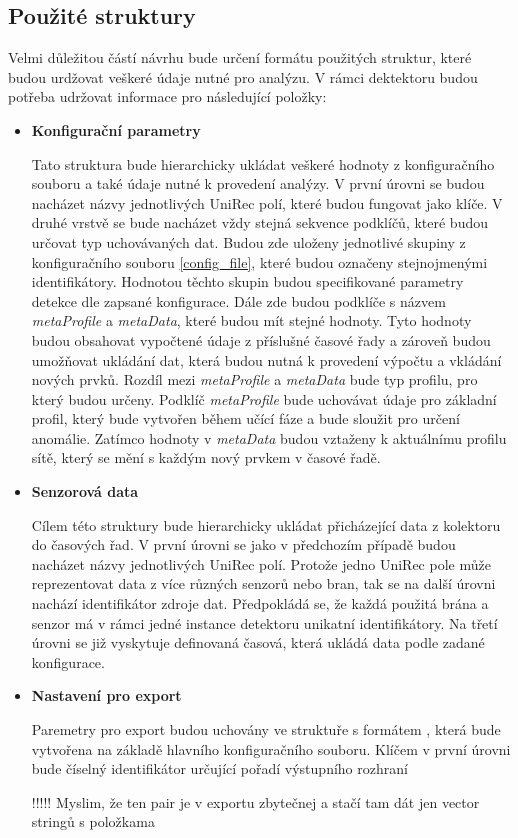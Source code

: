  \subsection{Použité struktury}
 Velmi důležitou částí návrhu bude určení formátu použitých struktur, které budou urdžovat veškeré 
 údaje nutné pro analýzu. V rámci dektektoru budou potřeba udržovat informace pro následující
 položky:
  \begin{itemize}
   \item \textbf{Konfigurační parametry}
   
   Tato struktura bude hierarchicky ukládat veškeré hodnoty z konfiguračního souboru
   a také údaje nutné k provedení analýzy. V první úrovni se budou nacházet názvy jednotlivých 
   UniRec polí, které budou fungovat jako klíče. V druhé vrstvě se bude nacházet vždy stejná 
   sekvence podklíčů, které budou určovat typ uchovávaných dat. Budou zde uloženy jednotlivé 
   skupiny z konfiguračního souboru \ref{config_file}, které budou označeny stejnojmenými
   identifikátory. Hodnotou těchto skupin budou specifikované parametry detekce dle zapsané
   konfigurace. Dále zde budou podklíče s názvem \textit{metaProfile} a \textit{metaData},
   které budou mít
   stejné hodnoty. Tyto hodnoty budou obsahovat vypočtené údaje z příslušné časové řady
   a zároveň budou umožňovat ukládání dat, která budou nutná k provedení výpočtu 
   a vkládání nových prvků. Rozdíl mezi \textit{metaProfile} a \textit{metaData} bude typ profilu,
   pro který budou určeny. Podklíč \textit{metaProfile} bude uchovávat údaje pro základní profil,
   který bude vytvořen během učící fáze a bude sloužit pro určení anomálie. Zatímco 
   hodnoty v \textit{metaData} budou vztaženy k aktuálnímu profilu sítě, který se mění s každým
   nový prvkem v časové řadě.
   
   \item \textbf{Senzorová data}
   
   Cílem této struktury bude hierarchicky ukládat přicházející data z kolektoru do časových řad. 
   V první úrovni se jako v předchozím případě budou nacházet názvy jednotlivých UniRec polí. 
   Protože jedno UniRec pole může reprezentovat data z více různých senzorů nebo bran, tak se na 
   další úrovni nachází identifikátor zdroje dat. Předpokládá se, že každá použitá brána a senzor 
   má v rámci jedné instance detektoru unikatní identifikátory. Na třetí úrovni se již vyskytuje 
   definovaná časová, která ukládá data podle zadané konfigurace.
   
   \item \textbf{Nastavení pro export} 
   
   Paremetry pro export budou uchovány ve struktuře s formátem , která bude vytvořena na základě 
   hlavního konfiguračního souboru. Klíčem v první úrovni bude číselný identifikátor určující 
   pořadí výstupního rozhraní 
   
   !!!!! Myslim, že ten pair je v exportu zbytečnej a stačí tam dát jen vector stringů s položkama
  \end{itemize}

